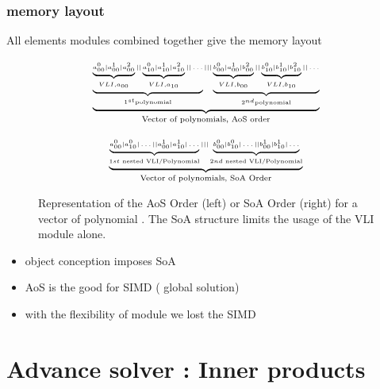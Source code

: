 \documentclass[oribibl]{llncs2e/llncs}
\begin{document}
\subsubsection{memory layout}

All elements modules combined together give the memory layout

\begin{figure}
   \begin{minipage}{0.50\linewidth}
        \begin{eqnarray}
        \tiny{
                \underbrace{
                 \underbrace{ \underbrace{a^0_{00} | a^1_{00} | a^2_{00}}_{VLI, a_{00} } || \underbrace{a^0_{10} | a^1_{10} | a^2_{10}}_{VLI, a_{10}} ||   \dots  }_{1^{st} \textrm{polynomial}} 
                  |||    \underbrace{ \underbrace{b^0_{00} | a^1_{00} | b^2_{00}}_{VLI, b_{00} } || \underbrace{b^0_{10} | b^1_{10} | b^2_{10}}_{VLI, b_{10}} ||   \dots  }_{2^{nd} \textrm{polynomial} } }_{\textrm{Vector of polynomials, AoS order}} \nonumber
            }
        \end{eqnarray}
    \end{minipage}
\begin{minipage}{0.50\linewidth}
   \begin{eqnarray}
    \tiny{
        \underbrace{
        \underbrace{a^0_{00} | a^0_{10} | \dots || a^1_{00} | a^1_{10} | \dots  }_{1st  \textrm{ nested VLI/Polynomial} } |||  \underbrace{b^0_{00} | b^0_{10} | \dots || b^1_{00} | b^1_{10} | \dots  }_{2nd  \textrm{ nested VLI/Polynomial} }
        }_{\textrm{Vector of polynomials, SoA Order}} \nonumber }
       \end{eqnarray}
\end{minipage}
\caption{Representation of the AoS Order (left) or SoA Order (right) for a vector of polynomial \label{AOSSOA}.  The SoA structure limits the usage of the VLI module alone.}
\end{figure}


\begin{itemize}
\item object conception imposes SoA
\item AoS is the good for SIMD ( global solution)
\item  with the flexibility of module we lost the SIMD 
\end{itemize}

\section{Advance solver : Inner products}
\end{document}
